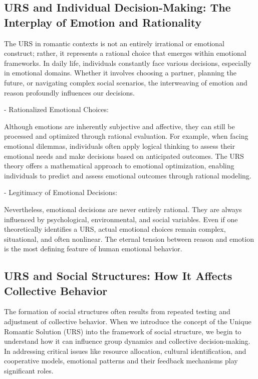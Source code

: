 \documentclass{article}
\begin{document}
\subsection{URS and Individual Decision-Making: The Interplay of Emotion and Rationality}

The URS in romantic contexts is not an entirely irrational or emotional construct; rather, it represents a rational choice that emerges within emotional frameworks. In daily life, individuals constantly face various decisions, especially in emotional domains. Whether it involves choosing a partner, planning the future, or navigating complex social scenarios, the interweaving of emotion and reason profoundly influences our decisions.

- Rationalized Emotional Choices:

Although emotions are inherently subjective and affective, they can still be processed and optimized through rational evaluation. For example, when facing emotional dilemmas, individuals often apply logical thinking to assess their emotional needs and make decisions based on anticipated outcomes. The URS theory offers a mathematical approach to emotional optimization, enabling individuals to predict and assess emotional outcomes through rational modeling.

- Legitimacy of Emotional Decisions:

Nevertheless, emotional decisions are never entirely rational. They are always influenced by psychological, environmental, and social variables. Even if one theoretically identifies a URS, actual emotional choices remain complex, situational, and often nonlinear. The eternal tension between reason and emotion is the most defining feature of human emotional behavior.

\subsection{URS and Social Structures: How It Affects Collective Behavior}

The formation of social structures often results from repeated testing and adjustment of collective behavior. When we introduce the concept of the Unique Romantic Solution (URS) into the framework of social structure, we begin to understand how it can influence group dynamics and collective decision-making. In addressing critical issues like resource allocation, cultural identification, and cooperative models, emotional patterns and their feedback mechanisms play significant roles.
\end{document}
